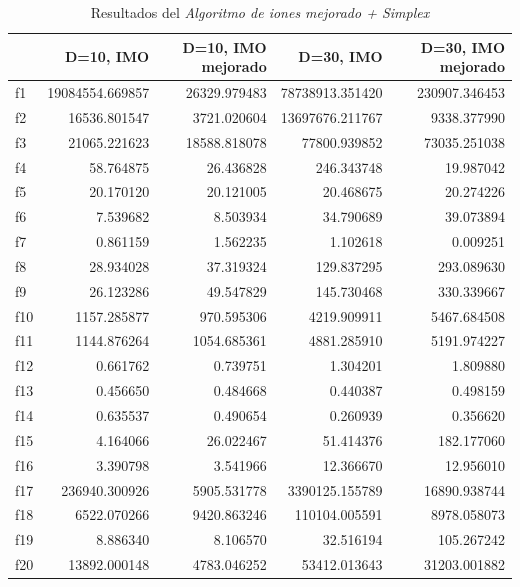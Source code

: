 \documentclass[a4paper,11pt]{article}
\begin{document}
\begin{itemize}
 \begin{table}[H]	
  \caption{Resultados del \textit{Algoritmo de iones mejorado + Simplex}}
  \centering
  \begin{tabular}{|l|r|r|||r|r|}
  \hline
  & \textbf{D=10, IMO} & \textbf{D=10, IMO mejorado} & \textbf{D=30, IMO} & \textbf{D=30, IMO mejorado}\\ \hline
  f1 &  19084554.669857 &  26329.979483 &  78738913.351420 &  230907.346453 \\ \hline
  f2 &  16536.801547 &  3721.020604 &  13697676.211767 &  9338.377990 \\ \hline
  f3 &  21065.221623 &  18588.818078 &  77800.939852 &  73035.251038 \\ \hline
  f4 &  58.764875 &  26.436828 &  246.343748 &  19.987042 \\ \hline
  f5 &  20.170120 &  20.121005 &  20.468675 &  20.274226 \\ \hline
  f6 &  7.539682 &  8.503934 &  34.790689 &  39.073894 \\ \hline
  f7 &  0.861159 &  1.562235 &  1.102618 &  0.009251 \\ \hline
  f8 &  28.934028 &  37.319324 &  129.837295 &  293.089630 \\ \hline
  f9 &  26.123286 &  49.547829 &  145.730468 &  330.339667 \\ \hline
  f10 &  1157.285877 &  970.595306 &  4219.909911 &  5467.684508 \\ \hline
  f11 &  1144.876264 &  1054.685361 &  4881.285910 &  5191.974227 \\ \hline
  f12 &  0.661762 &  0.739751 &  1.304201 &  1.809880 \\ \hline
  f13 &  0.456650 &  0.484668 &  0.440387 &  0.498159 \\ \hline
  f14 &  0.635537 &  0.490654 &  0.260939 &  0.356620 \\ \hline
  f15 &  4.164066 &  26.022467 &  51.414376 &  182.177060 \\ \hline
  f16 &  3.390798 &  3.541966 &  12.366670 &  12.956010 \\ \hline
  f17 &  236940.300926 &  5905.531778 &  3390125.155789 &  16890.938744 \\ \hline
  f18 &  6522.070266 &  9420.863246 &  110104.005591 &  8978.058073 \\ \hline
  f19 &  8.886340 &  8.106570 &  32.516194 &  105.267242 \\ \hline
  f20 &  13892.000148 &  4783.046252 &  53412.013643 &  31203.001882 \\ \hline
  \end{tabular}
  \end{table}
 

\end{itemize}
\end{document}
